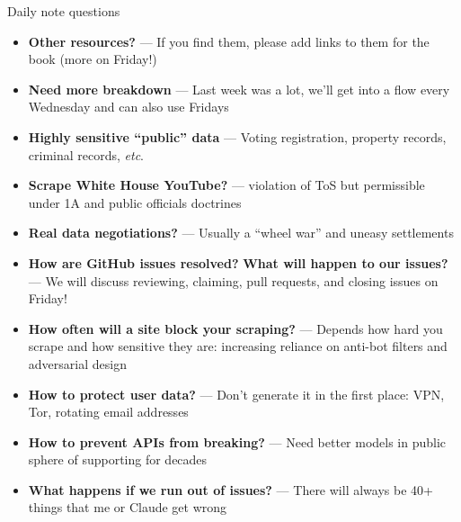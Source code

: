 \documentclass[9pt,aspectratio=169]{beamer}
\begin{document}
\begin{frame}{Daily note questions} \small

    \begin{itemize}
        \item \textbf{Other resources?} --- If you find them, please add links to them for the book (more on Friday!)
        \item \textbf{Need more breakdown} --- Last week was a lot, we'll get into a flow every Wednesday and can also use Fridays
        \item \textbf{Highly sensitive ``public'' data} --- Voting registration, property records, criminal records, \textit{etc}.
        \item \textbf{Scrape White House YouTube?} --- violation of ToS but permissible under 1A and public officials doctrines
        \item \textbf{Real data negotiations?} --- Usually a ``wheel war'' and uneasy settlements
        \item \textbf{How are GitHub issues resolved?} \textbf{What will happen to our issues?} --- We will discuss reviewing, claiming, pull requests, and closing issues on Friday!
        \item \textbf{How often will a site block your scraping?} --- Depends how hard you scrape and how sensitive they are: increasing reliance on anti-bot filters and adversarial design
        \item \textbf{How to protect user data?} --- Don't generate it in the first place: VPN, Tor, rotating email addresses
        \item \textbf{How to prevent APIs from breaking?} --- Need better models in public sphere of supporting for decades
        \item \textbf{What happens if we run out of issues?} --- There will always be 40+ things that me or Claude get wrong
    \end{itemize}
    
\end{frame}
\end{document}
